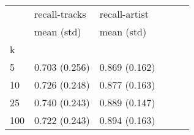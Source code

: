 \documentclass{standalone}
\begin{document}
\begin{tabular}{lllrll}
\toprule
                &  recall-tracks &  recall-artist \\
            &     mean (std) &     mean (std) \\
k        &                &                \\
\midrule
5 &     0.703 (0.256) &  0.869 (0.162) \\
10 &     0.726 (0.248) &  0.877 (0.163) \\
25  &    0.740 (0.243) &  0.889 (0.147) \\
100 &     0.722 (0.243) &  0.894 (0.163) \\
\bottomrule
\end{tabular}
\end{document}
